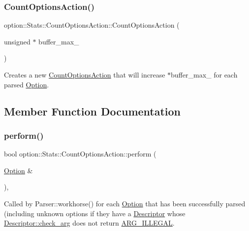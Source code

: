 \subsubsection{\texorpdfstring{Count\+Options\+Action()}{CountOptionsAction()}}
{\footnotesize\ttfamily option\+::\+Stats\+::\+Count\+Options\+Action\+::\+Count\+Options\+Action (\begin{DoxyParamCaption}\item[{unsigned $\ast$}]{buffer\+\_\+max\+\_\+ }\end{DoxyParamCaption})\hspace{0.3cm}{\ttfamily [inline]}}

Creates a new \hyperlink{classoption_1_1_stats_1_1_count_options_action}{Count\+Options\+Action} that will increase {\ttfamily $\ast$buffer\+\_\+max\+\_\+} for each parsed \hyperlink{classoption_1_1_option}{Option}. 

\subsection{Member Function Documentation}
\mbox{\label{classoption_1_1_stats_1_1_count_options_action_a29ab8a68d0a30736b99b4d2e5dece489}} 
\subsubsection{\texorpdfstring{perform()}{perform()}}
{\footnotesize\ttfamily bool option\+::\+Stats\+::\+Count\+Options\+Action\+::perform (\begin{DoxyParamCaption}\item[{\hyperlink{classoption_1_1_option}{Option} \&}]{ }\end{DoxyParamCaption})\hspace{0.3cm}{\ttfamily [inline]}, {\ttfamily [virtual]}}



Called by Parser\+::workhorse() for each \hyperlink{classoption_1_1_option}{Option} that has been successfully parsed (including unknown options if they have a \hyperlink{structoption_1_1_descriptor}{Descriptor} whose \hyperlink{structoption_1_1_descriptor_aa5d675dba0214a4abd73007ff163cc67}{Descriptor\+::check\+\_\+arg} does not return \hyperlink{namespaceoption_aee8c76a07877335762631491e7a5a1a9a9528e32563b795bd2930b12d0a5e382d}{A\+R\+G\+\_\+\+I\+L\+L\+E\+G\+AL}. 

